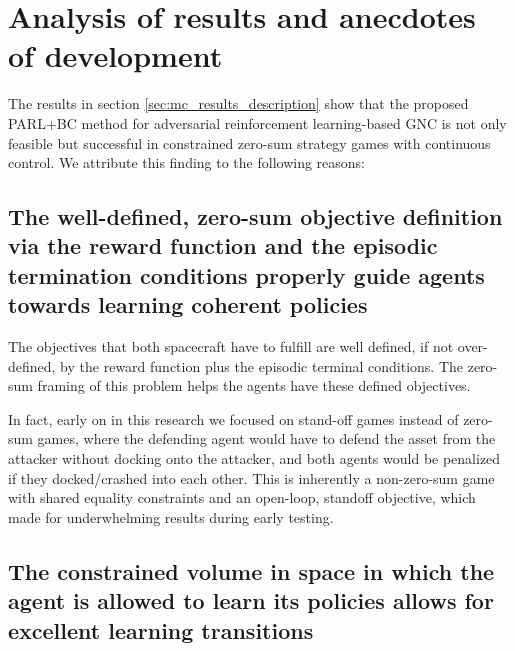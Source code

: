 

\section{Analysis of results and anecdotes of development}
\label{sec:analysis-and-anecdotes}

The results in section \ref{sec:mc_results_description} show that the proposed PARL+BC method for adversarial reinforcement learning-based GNC is not only feasible but successful in constrained zero-sum strategy games with continuous control. We attribute this finding to the following reasons:

\subsection*{The well-defined, zero-sum objective definition via the reward function and the episodic termination conditions properly guide agents towards learning coherent policies}

The objectives that both spacecraft have to fulfill are well defined, if not over-defined, by the reward function plus the episodic terminal conditions. The zero-sum framing of this problem helps the agents have these defined objectives.
    
In fact, early on in this research we focused on stand-off games instead of zero-sum games, where the defending agent would have to defend the asset from the attacker without docking onto the attacker, and both agents would be penalized if they docked/crashed into each other. This is inherently a non-zero-sum game with shared equality constraints and an open-loop, standoff objective, which made for underwhelming results during early testing.

\subsection*{The constrained volume in space in which the agent is allowed to learn its policies allows for excellent learning transitions}


